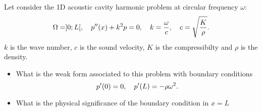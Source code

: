 \bexo

Let consider the 1D acoustic cavity harmonic problem at circular frequency $\omega$:
\begin{equation}
\Omega=]0;L[, \quad p''(x)+k^2 p=0, \quad k=\dfrac{\omega}{c}, \quad c=\sqrt{\dfrac{K}{\rho}}.
\end{equation}
$k$ is the wave number, $c$ is the sound velocity, $K$ is the compressibilty and $\rho$ is the density.

\begin{itemize}
	\item 
What is the weak form associated to this problem with boundary conditions
\begin{equation}
	 p'(0)=0 , \quad p'(L)=-\rho\omega^2. 
\end{equation}

	\item What is the physical significance of the boundary condition in $x=L$
\end{itemize}
\eexo

